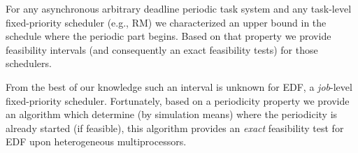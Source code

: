 \documentclass[a4paper,11pt]{article}
\newcommand{\EDF}{\textrm{EDF}}
\newcommand{\RM}{\textrm{RM}}
\begin{document}
For any asynchronous arbitrary deadline periodic task system and any task-level fixed-priority scheduler (e.g., \RM) we characterized an upper bound in the schedule where the periodic part begins. Based on that property we provide   feasibility intervals (and consequently an exact feasibility tests) for those schedulers.

From the best of our knowledge such an interval is unknown for \EDF, a \emph{job}-level fixed-priority scheduler. Fortunately, based on a periodicity property we provide an algorithm which determine (by simulation means) where the periodicity is already started (if feasible), this algorithm provides an \emph{exact} feasibility test for \EDF{} upon heterogeneous multiprocessors.



\end{document}
